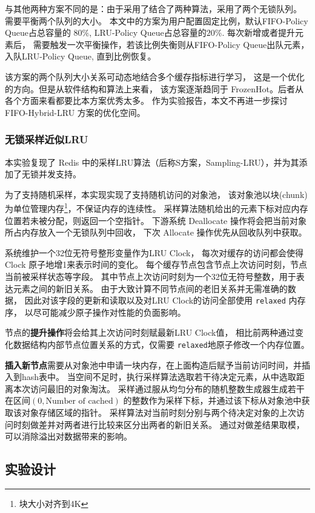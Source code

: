 与其他两种方案不同的是：由于采用了结合了两种算法，采用了两个无锁队列。
需要平衡两个队列的大小。
本文中的方案为用户配置固定比例，默认FIFO-Policy Queue占总容量的 $80\%$,
LRU-Policy Queue占总容量的$20\%$. 每次新增或者提升元素后，
需要触发一次平衡操作，若该比例失衡则从FIFO-Policy Queue出队元素，
入队LRU-Policy Queue, 直到比例恢复。

该方案的两个队列大小关系可动态地结合多个缓存指标进行学习，
这是一个优化的方向。但是从软件结构和算法上来看，
该方案逐渐趋同于 FrozenHot。后者从各个方面来看都要比本方案优秀太多。
作为实验报告，本文不再进一步探讨 FIFO-Hybrid-LRU 方案的优化空间。

\subsubsection{无锁采样近似LRU}

本实验复现了 Redis 中的采样LRU算法（后称S方案，Sampling-LRU），并为其添加了无锁并发支持。

为了支持随机采样，本实现实现了支持随机访问的对象池，
该对象池以块(chunk)为单位管理内存\footnote{块大小对齐到4K}，不保证内存的连续性。
采样算法随机给出的元素下标对应内存位置若未被分配，则返回一个空指针。
下游系统 Deallocate 操作将会把当前对象所占内存放入一个无锁队列中回收，
下次 Allocate 操作优先从回收队列中获取。

系统维护一个32位无符号整形变量作为LRU Clock，
每次对缓存的访问都会使得Clock 原子地增1来表示时间的变化。
每个缓存节点包含节点上次访问时刻，节点当前被采样状态等字段。
其中节点上次访问时刻为一个32位无符号整数，用于表达元素之间的新旧关系。
由于大致计算不同节点间的老旧关系并无需准确的数据，
因此对该字段的更新和读取以及对LRU Clock的访问全部使用 \verb|relaxed| 内存序，
以尽可能减少原子操作对性能的负面影响。

节点的\textbf{提升操作}将会给其上次访问时刻赋最新LRU Clock值，
相比前两种通过变化数据结构内部节点位置关系的方式，仅需要 \verb|relaxed|地原子修改一个内存位置。

\textbf{插入新节点}需要从对象池中申请一块内存，在上面构造后赋予当前访问时间，并插入到hash表中。
当空间不足时，执行采样算法选取若干待决定元素，从中选取距离本次访问最旧的对象淘汰。
采样通过服从均匀分布的随机整数生成器生成若干在区间$\allowbreak (0, \mbox{Number of cached})$
的整数作为采样下标，并通过该下标从对象池中获取该对象存储区域的指针。
采样算法对当前时刻分别与两个待决定对象的上次访问时刻做差并对两者进行比较来区分出两者的新旧关系。
通过对做差结果取模，可以消除溢出对数据带来的影响。

\subsection{实验设计}

